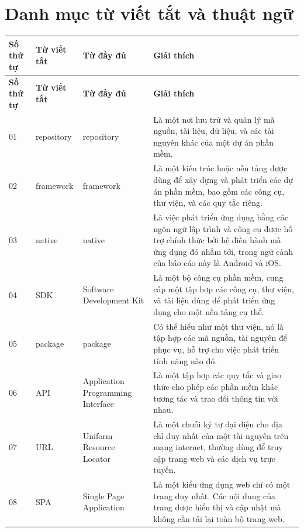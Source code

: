 \chapter*{Danh mục từ viết tắt và thuật ngữ}
\label{Danh mục từ viết tắt và thuật ngữ}

\begin{center}
    \begin{longtable}{|p{1cm}|p{2.75cm}|p{2.75cm}|p{8cm}|}
        \hline
        \textbf{Số thứ tự}  & \textbf{Từ viết tắt} & \textbf{Từ đầy đủ} & \textbf{Giải thích} \\
        \endfirsthead
        \hline
        \textbf{Số thứ tự}  & \textbf{Từ viết tắt} & \textbf{Từ đầy đủ} & \textbf{Giải thích} \\
        \endhead
        \hline
        01 & repository & repository & Là một nơi lưu trữ và quản lý mã nguồn, tài liệu, dữ liệu, và các tài nguyên khác của một dự án phần mềm. \\ 
        \hline
        02 & framework & framework & Là một kiến trúc hoặc nền tảng được dùng để xây dựng và phát triển các dự án phần mềm, bao gồm các công cụ, thư viện, và các quy tắc riêng. \\ 
        \hline
        03 & native & native & Là việc phát triển ứng dụng bằng các ngôn ngữ lập trình và công cụ được hỗ trợ chính thức bởi hệ điều hành mà ứng dụng đó nhắm tới, trong ngữ cảnh của báo cáo này là Android và iOS. \\ 
        \hline
        04 & SDK & Software Development Kit & Là một bộ công cụ phần mềm, cung cấp một tập hợp các công cụ, thư viện, và tài liệu dùng để phát triển ứng dụng cho một nền tảng cụ thể. \\ 
        \hline
        05 & package & package & Có thể hiểu như một thư viện, nó là tập hợp các mã nguồn, tài nguyên để phục vụ, hỗ trợ cho việc phát triển tính năng nào đó. \\ 
        \hline
        06 & API & Application Programming Interface & Là một tập hợp các quy tắc và giao thức cho phép các phần mềm khác tương tác và trao đổi thông tin với nhau. \\ 
        \hline
        07 & URL & Uniform Resource Locator & Là một chuỗi ký tự đại diện cho địa chỉ duy nhất của một tài nguyên trên mạng internet, thường dùng để truy cập trang web và các dịch vụ trực tuyến. \\ 
        \hline
        08 & SPA & Single Page Application & Là một kiểu ứng dụng web chỉ có một trang duy nhất. Các nội dung của trang được hiển thị và cập nhật mà không cần tải lại toàn bộ trang web. \\ 

\end{longtable}
\end{center}

